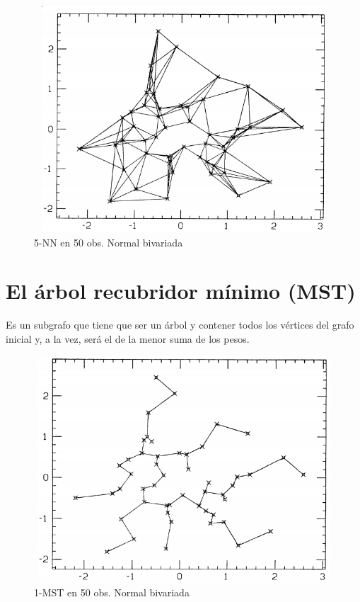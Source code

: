 \documentclass[]{book}
\begin{document}
\begin{figure}

{\centering \includegraphics[width=450,height=320]{5-nn} 

}

\caption{5-NN en 50 obs. Normal bivariada}\label{fig:unnamed-chunk-4}
\end{figure}

\section{El árbol recubridor mínimo
(MST)}\label{el-arbol-recubridor-minimo-mst}

Es un subgrafo que tiene que ser un árbol y contener todos los vértices
del grafo inicial y, a la vez, será el de la menor suma de los pesos.

\begin{figure}

{\centering \includegraphics[width=450,height=320]{1-MST} 

}

\caption{1-MST en 50 obs. Normal bivariada}\label{fig:unnamed-chunk-5}
\end{figure}
\end{document}
